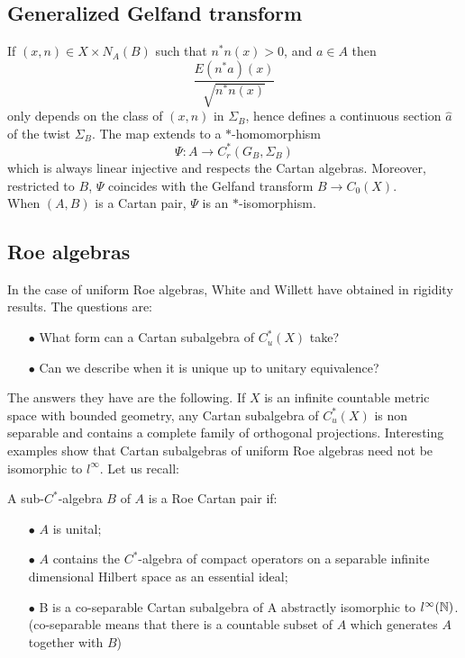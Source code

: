 \subsection{Generalized Gelfand transform}

If $(x,n)\in X \times N_A(B)$ such that $n^*n(x)>0$, and $a\in A$ then
\[\frac{E(n^*a)(x)}{\sqrt{ n^*n(x)} } \]
only depends on the class of $(x,n)$ in $\Sigma_B$, hence defines a continuous section $\hat a$ of the twist $\Sigma_B$. The map extends to a $*$-homomorphism
\[\Psi: A \rightarrow C^*_r(G_B, \Sigma_B)\]
which is always linear injective and respects the Cartan algebras. Moreover, restricted to $B$, $\Psi$ coincides with the Gelfand transform $B \rightarrow C_0(X)$.\\ 

When $(A,B)$ is a Cartan pair, $\Psi$ is an $*$-isomorphism.


\subsection{Roe algebras}

In the case of uniform Roe algebras, White and Willett have obtained in \cite{WhiteCartan} rigidity results. The questions are:
\begin{itemize} 
\item[$\bullet$] What form can a Cartan subalgebra of $C^*_u(X)$ take?
\item[$\bullet$] Can we describe when it is unique up to unitary equivalence?
\end{itemize}

The answers they have are the following. If $X$ is an infinite countable metric space with bounded geometry, any Cartan subalgebra of $C^*_u (X)$ is non separable and contains a complete family of orthogonal projections. Interesting examples show that Cartan subalgebras of uniform Roe algebras need not be isomorphic to $l^\infty$. Let us recall:
\begin{definition} A sub-$C^*$-algebra $B$ of $A$ is a Roe Cartan pair
if:
\begin{itemize}
\item[$\bullet$] $A$ is unital;
\item[$\bullet$] $A$ contains the $C^*$-algebra of compact operators on a separable infinite dimensional Hilbert space as an essential ideal;
\item[$\bullet$] B is a co-separable Cartan subalgebra of A abstractly isomorphic to $l^\infty (\mathbb N)$. (co-separable means that there is a countable subset of $A$ which generates $A$ together with $B$)
\end{itemize}
\end{definition}
 
